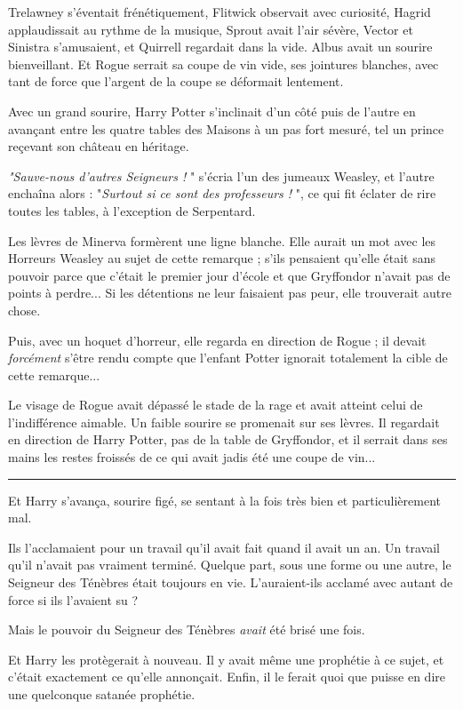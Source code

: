 Trelawney s'éventait frénétiquement, Flitwick observait avec curiosité, Hagrid applaudissait au rythme de la musique, Sprout avait l'air sévère, Vector et Sinistra s'amusaient, et Quirrell regardait dans la vide. Albus avait un sourire bienveillant. Et Rogue serrait sa coupe de vin vide, ses jointures blanches, avec tant de force que l'argent de la coupe se déformait lentement.

Avec un grand sourire, Harry Potter s'inclinait d'un côté puis de l'autre en avançant entre les quatre tables des Maisons à un pas fort mesuré, tel un prince reçevant son château en héritage.

\emph{"Sauve-nous d'autres Seigneurs !} " s'écria l'un des jumeaux Weasley, et l'autre enchaîna alors : "\emph{Surtout si ce sont des professeurs !} ", ce qui fit éclater de rire toutes les tables, à l'exception de Serpentard.

Les lèvres de Minerva formèrent une ligne blanche. Elle aurait un mot avec les Horreurs Weasley au sujet de cette remarque ; s'ils pensaient qu'elle était sans pouvoir parce que c'était le premier jour d'école et que Gryffondor n'avait pas de points à perdre... Si les détentions ne leur faisaient pas peur, elle trouverait autre chose.

Puis, avec un hoquet d'horreur, elle regarda en direction de Rogue ; il devait \emph{forcément}  s'être rendu compte que l'enfant Potter ignorait totalement la cible de cette remarque...

Le visage de Rogue avait dépassé le stade de la rage et avait atteint celui de l'indifférence aimable. Un faible sourire se promenait sur ses lèvres. Il regardait en direction de Harry Potter, pas de la table de Gryffondor, et il serrait dans ses mains les restes froissés de ce qui avait jadis été une coupe de vin...
\par\noindent\rule{\textwidth}{0.4pt}
Et Harry s'avança, sourire figé, se sentant à la fois très bien et particulièrement mal.

Ils l'acclamaient pour un travail qu'il avait fait quand il avait un an. Un travail qu'il n'avait pas vraiment terminé. Quelque part, sous une forme ou une autre, le Seigneur des Ténèbres était toujours en vie. L'auraient-ils acclamé avec autant de force si ils l'avaient su ?

Mais le pouvoir du Seigneur des Ténèbres \emph{avait}  été brisé une fois.

Et Harry les protègerait à nouveau. Il y avait même une prophétie à ce sujet, et c'était exactement ce qu'elle annonçait. Enfin, il le ferait quoi que puisse en dire une quelconque satanée prophétie.

